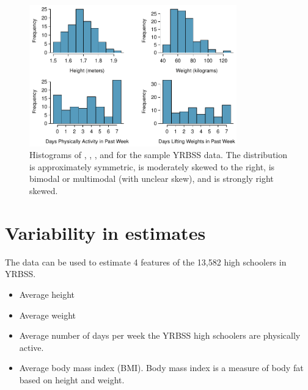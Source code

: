 \begin{spacing}{1.5}
\begin{figure}
\centering
\includegraphics[width=0.8\textwidth]
{ch_inference_foundations_oi_biostat/figures/yrbssSampHistograms/yrbssSampHistograms} 
\caption{Histograms of , , , and  for the sample YRBSS data. The  distribution is approximately symmetric,  is moderately skewed to the right,  is bimodal or multimodal (with unclear skew), and  is strongly right skewed.}
\label{yrbssSampHistograms}
\end{figure}

\section[Variability in estimates]{Variability in estimates} %
\label{variabilityInEstimates}


The data  can be used to estimate 4 features of the 13,582 high schoolers in YRBSS.
\begin{itemize}
\setlength{\itemsep}{0mm}
\item[(1)] Average height
\item[(2)] Average weight
\item[(3)] Average number of days per week the  YRBSS high schoolers are physically active.
\item[(4)] Average body mass index (BMI). Body mass index is a measure of body fat based on height and weight.
\end{itemize}


\end{spacing}
